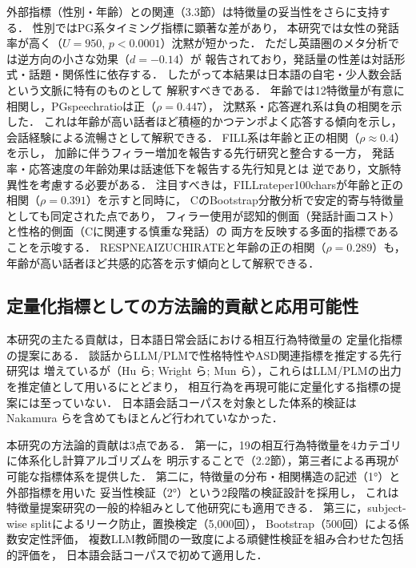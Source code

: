 \documentclass[dvipdfmx,11pt,a4paper]{bxjsarticle}
\renewcommand{\_}{\paperorigunderscore\allowbreak}%
\begin{document}
外部指標（性別・年齢）との関連（3.3節）は特徴量の妥当性をさらに支持する．
性別ではPG系タイミング指標に顕著な差があり，
本研究では女性の発話率が高く（$U = 950$, $p < 0.0001$）沈黙が短かった．
ただし英語圏のメタ分析\cite{leaper2007}では逆方向の小さな効果（$d = -0.14$）が
報告されており，発話量の性差は対話形式・話題・関係性に依存する\cite{bortfeld2001}．
したがって本結果は日本語の自宅・少人数会話という文脈に特有のものとして
解釈すべきである．
年齢では12特徴量が有意に相関し，PG\_speech\_ratioは正（$\rho = 0.447$），
沈黙系・応答遅れ系は負の相関を示した．
これは年齢が高い話者ほど積極的かつテンポよく応答する傾向を示し，
会話経験による流暢さとして解釈できる．
FILL系は年齢と正の相関（$\rho \approx 0.4$）を示し，
加齢に伴うフィラー増加を報告する先行研究\cite{bortfeld2001,horton2010}と整合する一方，
発話率・応答速度の年齢効果は話速低下を報告する先行知見\cite{horton2010}とは
逆であり，文脈特異性を考慮する必要がある．
注目すべきは，FILL\_rate\_per\_100charsが年齢と正の相関（$\rho = 0.391$）を示すと同時に，
CのBootstrap分散分析で安定的寄与特徴量としても同定された点であり，
フィラー使用が認知的側面（発話計画コスト）と性格的側面（Cに関連する慎重な発話）の
両方を反映する多面的指標であることを示唆する．
RESP\_NE\_AIZUCHI\_RATEと年齢の正の相関（$\rho = 0.289$）も，
年齢が高い話者ほど共感的応答を示す傾向として解釈できる．

\subsection{定量化指標としての方法論的貢献と応用可能性}

本研究の主たる貢献は，日本語日常会話における相互行為特徴量の
定量化指標の提案にある．
談話からLLM/PLMで性格特性やASD関連指標を推定する先行研究は
増えているが（Hu ら\cite{hu2025}; Wright ら\cite{wright2026};
Mun ら\cite{mun2024}），これらはLLM/PLMの出力を推定値として用いるにとどまり，
相互行為を再現可能に定量化する指標の提案には至っていない．
日本語会話コーパスを対象とした体系的検証は
Nakamura ら\cite{nakamura2025}を含めてもほとんど行われていなかった．

本研究の方法論的貢献は3点である．
第一に，19の相互行為特徴量を4カテゴリに体系化し計算アルゴリズムを
明示することで（2.2節），第三者による再現が可能な指標体系を提供した．
第二に，特徴量の分布・相関構造の記述（1°）と外部指標を用いた
妥当性検証（2°）という2段階の検証設計を採用し，
これは特徴量提案研究の一般的枠組みとして他研究にも適用できる．
第三に，subject-wise splitによるリーク防止，置換検定（5,000回），
Bootstrap（500回）による係数安定性評価，
複数LLM教師間の一致度による頑健性検証を組み合わせた包括的評価を，
日本語会話コーパスで初めて適用した．
\end{document}
